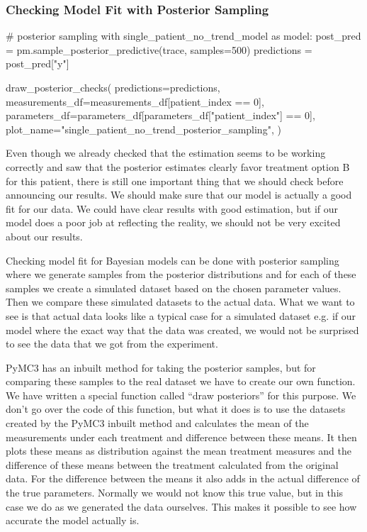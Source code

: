\documentclass[12pt,a4paper,leqno]{report}
\theoremstyle{plain}
\theoremstyle{definition}
\theoremstyle{remark}
\begin{document}

\subsubsection{Checking Model Fit with Posterior Sampling}

\bigskip
\begin{pyverbatim}
# posterior sampling
with single_patient_no_trend_model as model:
    post_pred = pm.sample_posterior_predictive(trace, samples=500)
    predictions = post_pred["y"]

draw_posterior_checks(
    predictions=predictions,
    measurements_df=measurements_df[patient_index == 0],
    parameters_df=parameters_df[parameters_df["patient_index"] == 0],
    plot_name="single_patient_no_trend_posterior_sampling",
)
\end{pyverbatim}
\bigskip


Even though we already checked that the estimation seems to be working correctly and saw
that the posterior estimates clearly favor treatment option B for this patient, there is
still one important thing that we should check before announcing our results. We should
make sure that our model is actually a good fit for our data. We could have clear
results with good estimation, but if our model does a poor job at reflecting the
reality, we should not be very excited about our results.

Checking model fit for Bayesian models can be done with posterior sampling where we generate samples from
the posterior distributions and for each of these samples we create a simulated dataset based
on the chosen parameter values. Then we compare these simulated datasets to the actual
data. What we want to see is that actual data looks like a typical case for a simulated
dataset e.g. if our model where the exact way that the data was created, we would not be
surprised to see the data that we got from the experiment.

PyMC3 has an inbuilt method for taking the posterior samples, but for comparing these
samples to the real dataset we have to create our own function. We have written a special function
called ``draw posteriors'' for this purpose. We don't go over the code of this function,
but what it does is to use the datasets created by the PyMC3 inbuilt method and
calculates the mean of the measurements under each treatment and difference between
these means. It then plots these means as distribution against the mean treatment
measures and the difference of these means between the treatment calculated from the
original data. For the difference between the means it also adds in the actual
difference of the true parameters. Normally we would not know
this true value, but in this case we do as we generated the data ourselves. This
makes it possible to see how accurate the model actually is.
\end{document}
